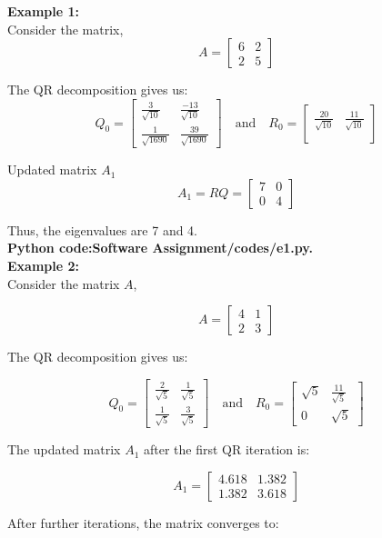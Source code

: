 \documentclass[journal]{IEEEtran}
\begin{document}
\textbf{Example 1:}\\
Consider the matrix, 
\[
	A= \begin{bmatrix}
		6 & 2\\
		2 & 5
	\end{bmatrix}
\]

The QR decomposition gives us:
\[
Q_0 = \begin{bmatrix}
	\frac{3}{\sqrt{10}} & \frac{-13}{\sqrt{10}} \\
	\frac{1}{\sqrt{1690}} & \frac{39}{\sqrt{1690}}
\end{bmatrix}
\quad \text{and} \quad
R_0 = \begin{bmatrix}
	\frac{20}{\sqrt{10}} & \frac{11}{\sqrt{10}} \\
\end{bmatrix}
\]

Updated matrix \(A_1\)
\[
	A_1=RQ=\begin{bmatrix}
		7 & 0\\
		0 & 4
	\end{bmatrix}
\]

Thus, the eigenvalues are 7 and 4.\\
\textbf{Python code:Software Assignment/codes/e1.py.}\\

\textbf{Example 2:}\\
Consider the matrix \( A \),

\[
A = \begin{bmatrix}
	4 & 1 \\
	2 & 3
\end{bmatrix}
\]

The QR decomposition gives us:

\[
Q_0 = \begin{bmatrix}
	\frac{2}{\sqrt{5}} & \frac{1}{\sqrt{5}} \\
	\frac{1}{\sqrt{5}} & \frac{3}{\sqrt{5}}
\end{bmatrix}
\quad \text{and} \quad
R_0 = \begin{bmatrix}
	\sqrt{5} & \frac{11}{\sqrt{5}} \\
	0 & \sqrt{5}
\end{bmatrix}
\]

The updated matrix \( A_1 \) after the first QR iteration is:

\[
A_1 = \begin{bmatrix}
	4.618 & 1.382 \\
	1.382 & 3.618
\end{bmatrix}
\]

After further iterations, the matrix converges to:
\end{document}
